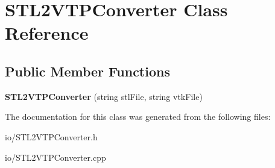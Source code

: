 \hypertarget{class_s_t_l2_v_t_p_converter}{}\section{S\+T\+L2\+V\+T\+P\+Converter Class Reference}
\label{class_s_t_l2_v_t_p_converter}
\subsection*{Public Member Functions}
\begin{DoxyCompactItemize}
\item 
\mbox{\label{class_s_t_l2_v_t_p_converter_a69f63fdb87568c90320c51134dd8c7d6}} 
{\bfseries S\+T\+L2\+V\+T\+P\+Converter} (string stl\+File, string vtk\+File)
\end{DoxyCompactItemize}


The documentation for this class was generated from the following files\+:\begin{DoxyCompactItemize}
\item 
io/S\+T\+L2\+V\+T\+P\+Converter.\+h\item 
io/S\+T\+L2\+V\+T\+P\+Converter.\+cpp\end{DoxyCompactItemize}
